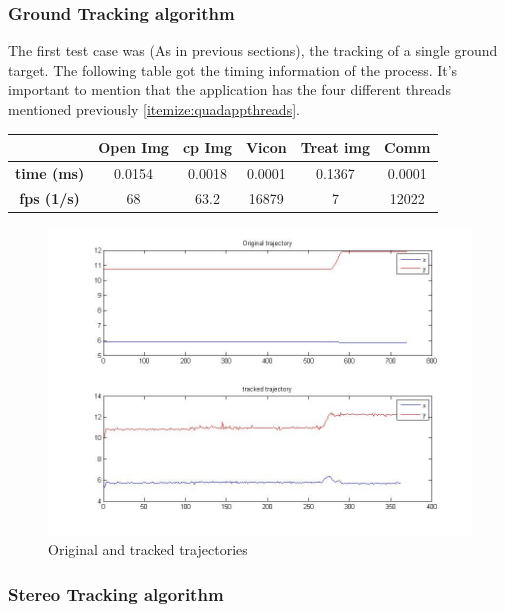 	
	\subsubsection{Ground Tracking algorithm}
	
	The first test case was (As in previous sections), the tracking of a single ground target. The following table got the timing information of the process. It's important to mention that the application has the four different threads mentioned previously \ref{itemize:quadappthreads}.
	
	{
	\centering
		\begin{tabular}{|c|c|c|c|c|c|}
		\hline  					&  Open Img	&  cp Img 	& Vicon 	& Treat img & Comm  		\\ 
		\hline  \textbf{time (ms)}	& 	0.0154	& 0.0018	&	0.0001	&  	 0.1367	&	0.0001		\\ 
		\hline  \textbf{fps (1/s)}	&  	68		&  63.2		&  16879	&  	7		&	12022		\\ 
		\hline 
		\end{tabular} 
	}

	\begin{figure}[ph]
		\centering
		\includegraphics[width=\linewidth]{../Images/c4/arch_trajs}
		\caption{Original and tracked trajectories}
		\label{fig:arch_trajs}
	\end{figure}

	
	\subsubsection{Stereo Tracking algorithm}